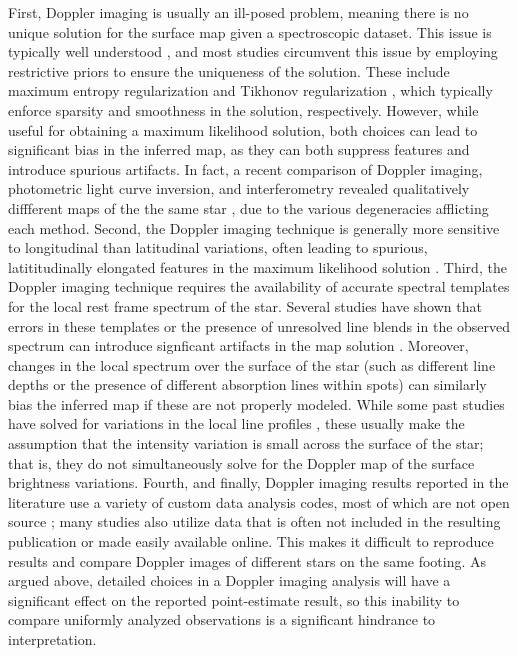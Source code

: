 \documentclass[modern]{aastex631}
\begin{document}
First, Doppler imaging is usually an ill-posed problem, meaning there is no unique solution for the surface map given a spectroscopic dataset.
This issue is typically well understood \citep[e.g.,][]{Piskunov1990,Rice2002}, and most studies circumvent this issue by employing restrictive priors to ensure the uniqueness of the solution. 
These include maximum entropy regularization \citep{Vogt1987} and Tikhonov regularization \citep[e.g.,][]{Piskunov1990}, which typically enforce sparsity and smoothness in the solution, respectively.
However, while useful for obtaining a maximum likelihood solution, both choices can lead to significant bias in the inferred map, as they can both suppress features and introduce spurious artifacts.
In fact, a recent comparison of Doppler imaging, photometric light curve inversion, and interferometry revealed qualitatively diffferent maps of the the same star \citep{Roettenbacher2017}, due to the various degeneracies afflicting each method.
%
Second, the Doppler imaging technique is generally more sensitive to longitudinal than latitudinal variations, often leading to spurious, latititudinally elongated features in the maximum likelihood solution \citep[e.g.,][]{Unruh1995,Crossfield2014b}.
%
Third, the Doppler imaging technique requires the availability of accurate spectral templates for the local rest frame spectrum of the star.
Several studies have shown that errors in these templates or the presence of unresolved line blends in the observed spectrum can introduce signficant artifacts in the map solution \citep[e.g.,][]{Rice1989,Unruh1995}.
Moreover, changes in the local spectrum over the surface of the star (such as different line depths or the presence of different absorption lines within spots) can similarly bias the inferred map if these are not properly modeled.
While some past studies have solved for variations in the local line profiles \citep{Khokhlova1976,Goncharskii1977,Goncharskii1982}, these usually make the assumption that the intensity variation is small across the surface of the star; that is, they do not simultaneously solve for the Doppler map of the surface brightness variations.
%
Fourth, and finally, Doppler imaging results reported in the literature use a variety of custom data analysis codes, most of which are not open source 
\citep[][to name a few]{Collier1997,Hackman2001,Carroll2012,Rosen2015,AsensioRamos2021}; %
many studies also utilize data that is often not included in the resulting publication or made easily available online. 
This makes it difficult to reproduce results and compare Doppler images of different stars on the same footing. 
As argued above, detailed choices in a Doppler imaging analysis will have a significant effect on the reported point-estimate result, so this inability to compare uniformly analyzed observations is a significant hindrance to interpretation.
\end{document}
